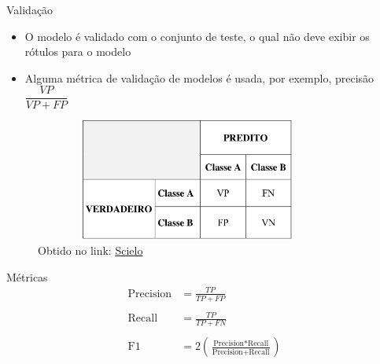 \begin{frame}	
	\begin{block}{Validação}	
		\begin{itemize}
			\item O modelo é validado com o conjunto de teste, o qual não deve exibir os rótulos para o modelo
			\item Alguma métrica de validação de modelos é usada, por exemplo, precisão $\dfrac{VP}{VP + FP}$
		\end{itemize}
				\begin{figure}[!htb]
			\centering	  				
			\includegraphics[height=4cm, width = 10cm]{./pic/matrizConfusao.png}
			\caption{Obtido no link: \href{http://www.scielo.br/pdf/eagri/v33n6/19.pdf}{Scielo} }
			\label{fig_matriz_confusao}
		\end{figure}	
	\end{block}
\end{frame}


\begin{frame}	
	\begin{block}{Métricas}	
		\begin{align*}
			\textrm{Precision} &= \frac{TP}{TP + FP} \\ \\
			\textrm{Recall} &= \frac{TP}{TP + FN} \\ \\
			\textrm{F1} &= 2 \left( \frac{  \textrm{Precision} * \textrm{Recall}    }{\textrm{Precision} + \textrm{Recall} } \right)
		\end{align*}
	\end{block}
\end{frame}


